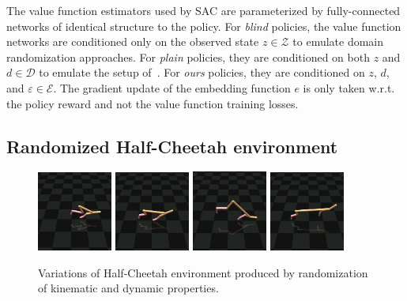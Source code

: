\documentclass{article}
\newcommand{\blind}{\emph{blind}}
\newcommand{\plain}{\emph{plain}}
\newcommand{\embed}{\emph{ours}}
\newcommand{\embedfn}{e}
\newcommand{\obset}{\mathcal{Z}}
\newcommand{\idset}{\mathcal{D}}
\newcommand{\obvar}{z}
\newcommand{\idvar}{d}
\newcommand{\latset}{\mathcal{E}}
\newcommand{\latvar}{\varepsilon}
\begin{document}
The value function estimators used by SAC are parameterized by fully-connected networks of identical structure to the policy.
For \blind{} policies, the value function networks are conditioned only on the observed state $\obvar \in \obset$ to emulate domain randomization approaches.
For \plain{} policies, they are conditioned on both $\obvar$ and $\idvar \in \idset$ to emulate the setup of~\citep{yu-up-osi-rss17}.
For \embed{} policies, they are conditioned on $\obvar$, $\idvar$, and $\latvar \in \latset$.
The gradient update of the embedding function $\embedfn$ is only taken w.r.t. the policy reward and not the value function training losses.



\subsection{Randomized Half-Cheetah environment}

\begin{figure}[ht]
\includegraphics[trim=4cm 3cm 0cm 4cm, clip, width=0.22\textwidth]{cheetah_short.png}\hfill
\includegraphics[trim=4cm 3cm 0cm 4cm, clip, width=0.22\textwidth]{cheetah_medium.png}\hfill
\includegraphics[trim=4cm 3cm 0cm 4cm, clip, width=0.22\textwidth]{cheetah_backleg.png}\hfill
\includegraphics[trim=4cm 3cm 0cm 4cm, clip, width=0.22\textwidth]{cheetah_long.png}
\caption{Variations of Half-Cheetah environment produced by randomization of kinematic and dynamic properties.}
\label{cheetahs}
\end{figure}
\end{document}
